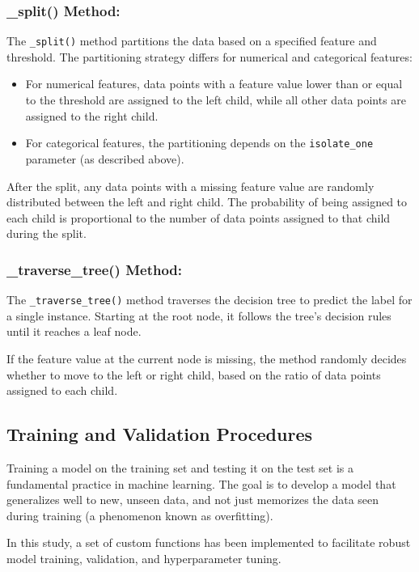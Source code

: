 \documentclass{article}
\begin{document}
\subsubsection*{\_split() Method:}

The \texttt{\_split()} method partitions the data based on a specified feature and threshold. The partitioning strategy differs for numerical and categorical features:

\begin{itemize}
\item For numerical features, data points with a feature value lower than or equal to the threshold are assigned to the left child, while all other data points are assigned to the right child.
\item For categorical features, the partitioning depends on the \texttt{isolate\_one} parameter (as described above).
\end{itemize}

After the split, any data points with a missing feature value are randomly distributed between the left and right child. The probability of being assigned to each child is proportional to the number of data points assigned to that child during the split.

\subsubsection*{\_traverse\_tree() Method:}

The \texttt{\_traverse\_tree()} method traverses the decision tree to predict the label for a single instance. Starting at the root node, it follows the tree's decision rules until it reaches a leaf node.

If the feature value at the current node is missing, the method randomly decides whether to move to the left or right child, based on the ratio of data points assigned to each child.

\subsection{Training and Validation Procedures}

Training a model on the training set and testing it on the test set is a fundamental practice in machine learning. The goal is to develop a model that generalizes well to new, unseen data, and not just memorizes the data seen during training (a phenomenon known as overfitting).

In this study, a set of custom functions has been implemented to facilitate robust model training, validation, and hyperparameter tuning.
\end{document}
